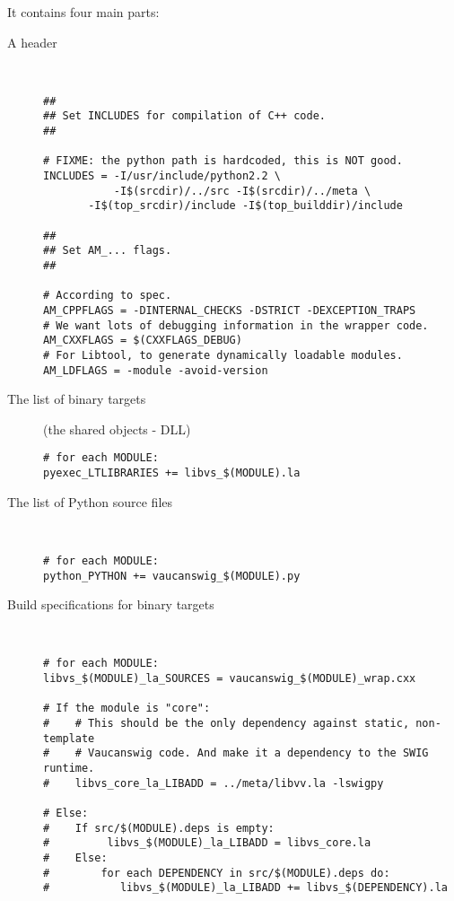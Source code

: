 It contains four main parts:
\begin{description}
\item[A header]~\\
\begin{lstlisting}[language=Make]
##
## Set INCLUDES for compilation of C++ code.
##

# FIXME: the python path is hardcoded, this is NOT good.
INCLUDES = -I/usr/include/python2.2 \
           -I$(srcdir)/../src -I$(srcdir)/../meta \
  	   -I$(top_srcdir)/include -I$(top_builddir)/include

##
## Set AM_... flags.
##

# According to spec.
AM_CPPFLAGS = -DINTERNAL_CHECKS -DSTRICT -DEXCEPTION_TRAPS
# We want lots of debugging information in the wrapper code.
AM_CXXFLAGS = $(CXXFLAGS_DEBUG)
# For Libtool, to generate dynamically loadable modules.
AM_LDFLAGS = -module -avoid-version
\end{lstlisting}%

\item[The list of binary targets]
(the shared objects - DLL)

\begin{lstlisting}[language=Make]
# for each MODULE:
pyexec_LTLIBRARIES += libvs_$(MODULE).la
\end{lstlisting}%

\item[The list of Python source files]~\\

\begin{lstlisting}[language=Make]
# for each MODULE:
python_PYTHON += vaucanswig_$(MODULE).py
\end{lstlisting}%
   
\item[Build specifications for binary targets]~\\

\begin{lstlisting}[language=Make]
# for each MODULE:
libvs_$(MODULE)_la_SOURCES = vaucanswig_$(MODULE)_wrap.cxx

# If the module is "core":
#    # This should be the only dependency against static, non-template
#    # Vaucanswig code. And make it a dependency to the SWIG runtime.
#    libvs_core_la_LIBADD = ../meta/libvv.la -lswigpy

# Else:
#    If src/$(MODULE).deps is empty:
#	      libvs_$(MODULE)_la_LIBADD = libvs_core.la
#    Else:
#        for each DEPENDENCY in src/$(MODULE).deps do:
#	        libvs_$(MODULE)_la_LIBADD += libvs_$(DEPENDENCY).la
\end{lstlisting}%
\end{description}
   
